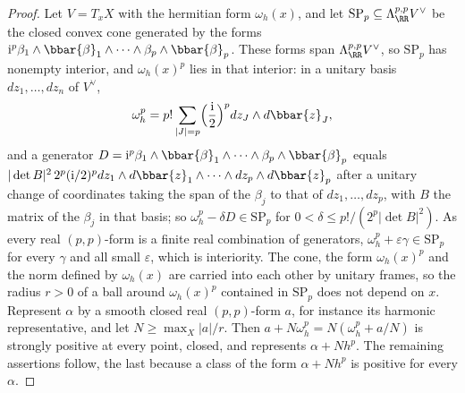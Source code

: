 \begin{proof}
Let $V=T_{x}X$ with the hermitian form $\omega_{h}(x)$, and let
$\mathrm{SP}_{p}\subseteq\Lambda^{p,p}_{\RR}V^{\vee}$ be the closed convex cone
generated by the forms $\mathrm{i}^{p}\beta_{1}\wedge\bbar{\beta}_{1}\wedge\cdots
\wedge\beta_{p}\wedge\bbar{\beta}_{p}$. These forms span
$\Lambda^{p,p}_{\RR}V^{\vee}$, so $\mathrm{SP}_{p}$ has nonempty interior, and
$\omega_{h}(x)^{p}$ lies in that interior: in a unitary basis $dz_{1},\dots,
dz_{n}$ of $V^{\vee}$,
\[
  \omega_{h}^{p}=p!\sum_{|J|=p}\Bigl(\frac{\mathrm{i}}{2}\Bigr)^{p}
  dz_{J}\wedge d\bbar{z}_{J},
\]
and a generator $D=\mathrm{i}^{p}\beta_{1}\wedge\bbar{\beta}_{1}\wedge\cdots\wedge
\beta_{p}\wedge\bbar{\beta}_{p}$ equals $|\det B|^{2}\,2^{p}(\mathrm{i}/2)^{p}
dz_{1}\wedge d\bbar{z}_{1}\wedge\cdots\wedge dz_{p}\wedge d\bbar{z}_{p}$ after a
unitary change of coordinates taking the span of the $\beta_{j}$ to that of
$dz_{1},\dots,dz_{p}$, with $B$ the matrix of the $\beta_{j}$ in that basis;
so $\omega_{h}^{p}-\delta D\in\mathrm{SP}_{p}$ for $0<\delta\le p!/(2^{p}
|\det B|^{2})$. As every real $(p,p)$-form is a finite real combination of
generators, $\omega_{h}^{p}+\varepsilon\gamma\in\mathrm{SP}_{p}$ for every
$\gamma$ and all small $\varepsilon$, which is interiority. The cone, the form
$\omega_{h}(x)^{p}$ and the norm defined by $\omega_{h}(x)$ are carried into
each other by unitary frames, so the radius $r>0$ of a ball around
$\omega_{h}(x)^{p}$ contained in $\mathrm{SP}_{p}$ does not depend on $x$.
Represent $\alpha$ by a smooth closed real $(p,p)$-form $a$, for instance its
harmonic representative, and let $N\ge\max_{X}|a|/r$. Then
$a+N\omega_{h}^{p}=N(\omega_{h}^{p}+a/N)$ is strongly positive at every point,
closed, and represents $\alpha+Nh^{p}$. The remaining assertions follow, the
last because a class of the form $\alpha+Nh^{p}$ is positive for every $\alpha$.
\end{proof}

